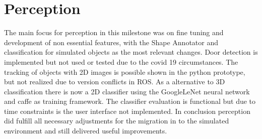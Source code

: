 \documentclass[main.tex]{subfiles}
\begin{document}
	
	\chapter{Perception}
	
The main focus for perception in this milestone was on fine tuning and development of non essential features, with the Shape Annotator and classification for simulated objects as the most relevant changes.
Door detection is implemented but not used or tested due to the covid 19 circumstances.
The tracking of objects with 2D images is possible shown in the python prototype, but not realized due to version conflicts in ROS.
As a alternative to 3D classification there is now a 2D classifier using the GoogleLeNet neural network and caffe as training framework.
The classifier evaluation is functional but due to time constraints is the user interface not implemented.
In conclusion perception did fulfill all necessary adjustments for the migration in to the simulated environment and still delivered useful improvements.

	
\end{document}
